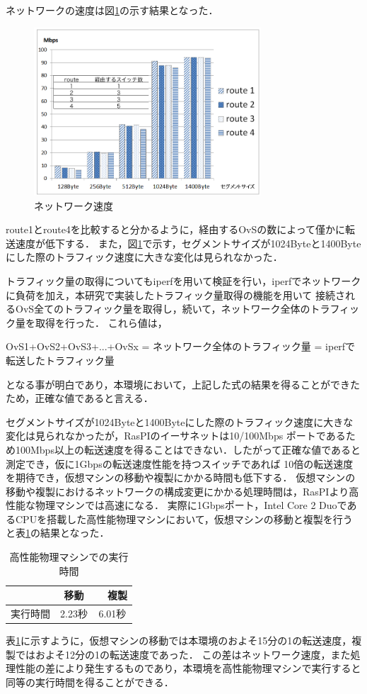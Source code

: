 \documentclass[submit,techrep]{ipsj}
\begin{document}
ネットワークの速度は図\ref{fig:graph}の示す結果となった．
\begin{figure}[tb]
	\includegraphics[width=8.5cm,bb=0 0 755 558]{fig/graph.png}
	\caption{ネットワーク速度}
	\label{fig:graph}
\end{figure}

route1とroute4を比較すると分かるように，経由するOvSの数によって僅かに転送速度が低下する．
また，図\ref{fig:graph}で示す，セグメントサイズが1024Byteと1400Byteにした際のトラフィック速度に大きな変化は見られなかった．

トラフィック量の取得についてもiperfを用いて検証を行い，iperfでネットワークに負荷を加え，本研究で実装したトラフィック量取得の機能を用いて
接続されるOvS全てのトラフィック量を取得し，続いて，ネットワーク全体のトラフィック量を取得を行った．
これら値は，

OvS1+OvS2+OvS3+...+OvSx = ネットワーク全体のトラフィック量 = iperfで転送したトラフィック量

となる事が明白であり，本環境において，上記した式の結果を得ることができたため，正確な値であると言える．

セグメントサイズが1024Byteと1400Byteにした際のトラフィック速度に大きな変化は見られなかったが，RasPIのイーサネットは10/100Mbps
ポートであるため100Mbps以上の転送速度を得ることはできない．したがって正確な値であると測定でき，仮に1Gbpsの転送速度性能を持つスイッチであれば
10倍の転送速度を期待でき，仮想マシンの移動や複製にかかる時間も低下する．
仮想マシンの移動や複製におけるネットワークの構成変更にかかる処理時間は，RasPIより高性能な物理マシンでは高速になる．
実際に1Gbpsポート，Intel Core 2 DuoであるCPUを搭載した高性能物理マシンにおいて，仮想マシンの移動と複製を行うと表\ref{tab:c2d}の結果となった．
\begin{table}[tb]
	\centering
	\caption{高性能物理マシンでの実行時間}
	\label{tab:c2d}
	\vspace{4mm}
	{
		\begin{tabular}{ c|c c } \hline
      & 移動 &　複製  \\ \hline \hline
      実行時間 & 2.23秒 & 6.01秒\\ \hline
		\end{tabular}
	}
\end{table}
表\ref{tab:c2d}に示すように，仮想マシンの移動では本環境のおよそ15分の1の転送速度，複製ではおよそ12分の1の転送速度であった．
この差はネットワーク速度，また処理性能の差により発生するものであり，本環境を高性能物理マシンで実行すると同等の実行時間を得ることができる．
\end{document}
